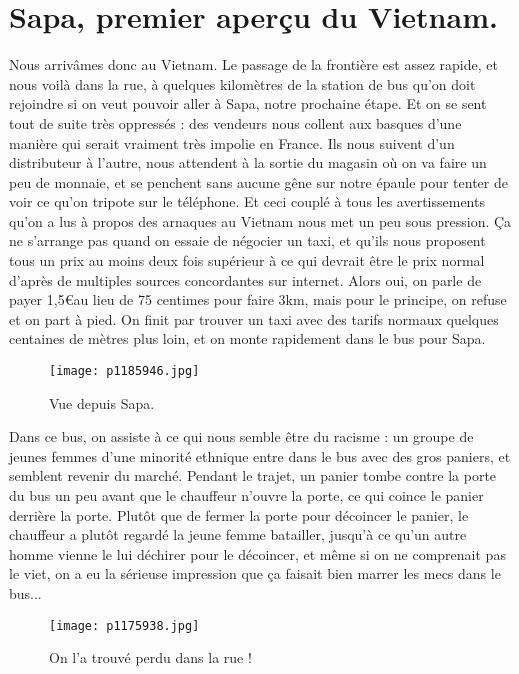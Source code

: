 \documentclass{book}
\begin{document}
\chapter{Sapa, premier aperçu du Vietnam.}
Nous arrivâmes donc au Vietnam. Le passage de la frontière est assez rapide, et nous voilà dans la rue, à quelques kilomètres de la station de bus qu'on doit rejoindre si on veut pouvoir aller à Sapa, notre prochaine étape. Et on se sent tout de suite très oppressés : des vendeurs nous collent aux basques d'une manière qui serait vraiment très impolie en France. Ils nous suivent d'un distributeur à l'autre, nous attendent à la sortie du magasin où on va faire un peu de monnaie, et se penchent sans aucune gêne sur notre épaule pour tenter de voir ce qu'on tripote sur le téléphone. Et ceci couplé à tous les avertissements qu'on a lus à propos des arnaques au Vietnam nous met un peu sous pression. Ça ne s'arrange pas quand on essaie de négocier un taxi, et qu'ils nous proposent tous un prix au moins deux fois supérieur à ce qui devrait être le prix normal d'après de multiples sources concordantes sur internet. Alors oui, on parle de payer 1,5\euro au lieu de 75 centimes pour faire 3km, mais pour le principe, on refuse et on part à pied. On finit par trouver un taxi avec des tarifs normaux quelques centaines de mètres plus loin, et on monte rapidement dans le bus pour Sapa.


\begin{figure}[h]
\centering
\texttt{[image: p1185946.jpg]}
\caption*{Vue depuis Sapa.}
\end{figure}

Dans ce bus, on assiste à ce qui nous semble être du racisme : un groupe de jeunes femmes d'une minorité ethnique entre dans le bus avec des gros paniers, et semblent revenir du marché. Pendant le trajet, un panier tombe contre la porte du bus un peu avant que le chauffeur n'ouvre la porte, ce qui coince le panier derrière la porte. Plutôt que de fermer la porte pour décoincer le panier, le chauffeur a plutôt regardé la jeune femme batailler, jusqu'à ce qu'un autre homme vienne le lui déchirer pour le décoincer, et même si on ne comprenait pas le viet, on a eu la sérieuse impression que ça faisait bien marrer les mecs dans le bus...


\begin{figure}[h]
\centering
\texttt{[image: p1175938.jpg]}
\caption*{On l'a trouvé perdu dans la rue !}
\end{figure}
\end{document}
